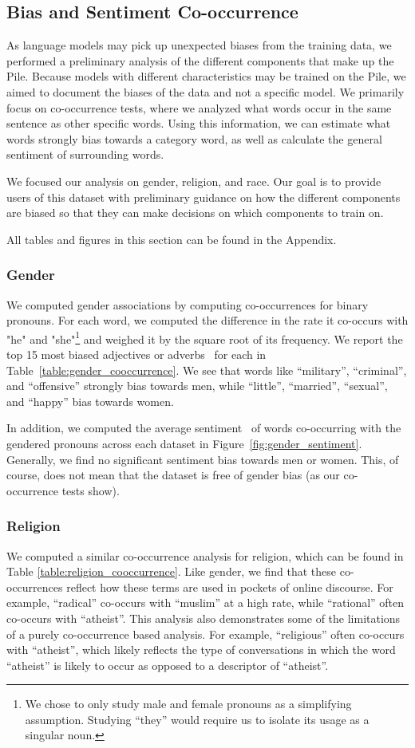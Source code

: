 \subsection{Bias and Sentiment Co-occurrence} As language models may pick up unexpected biases from the training data, we performed a preliminary analysis of the different components that make up the Pile. Because models with different characteristics may be trained on the Pile, we aimed to document the biases of the data and not a specific model. We primarily focus on co-occurrence tests, where we analyzed what words occur in the same sentence as other specific words. Using this information, we can estimate what words strongly bias towards a category word, as well as calculate the general sentiment of surrounding words.

We focused our analysis on gender, religion, and race. Our goal is to provide users of this dataset with preliminary guidance on how the different components are biased so that they can make decisions on which components to train on. 

All tables and figures in this section can be found in the Appendix.

\subsubsection{Gender}
We computed gender associations by computing co-occurrences for binary pronouns. For each word, we computed the difference in the rate it co-occurs with "he" and "she"\footnote{We chose to only study male and female pronouns as a simplifying assumption. Studying ``they'' would require us to isolate its usage as a singular noun. } and weighed it by the square root of its frequency. We report the top 15 most biased adjectives or adverbs~\citep{nltk} for each in Table~\ref{table:gender_cooccurrence}. We see that words like ``military'', ``criminal'', and ``offensive'' strongly bias towards men, while ``little'', ``married'', ``sexual'', and ``happy'' bias towards women.

In addition, we computed the average sentiment~\citep{sentiment} of words co-occurring with the gendered pronouns across each dataset in Figure~\ref{fig:gender_sentiment}. Generally, we find no significant sentiment bias towards men or women. This, of course, does not mean that the dataset is free of gender bias (as our co-occurrence tests show).

\subsubsection{Religion}
We computed a similar co-occurrence analysis for religion, which can be found in Table \ref{table:religion_cooccurrence}. Like gender, we find that these co-occurrences reflect how these terms are used in pockets of online discourse. For example, ``radical'' co-occurs with ``muslim'' at a high rate, while ``rational'' often co-occurs with ``atheist''. This analysis also demonstrates some of the limitations of a purely co-occurrence based analysis. For example, ``religious'' often co-occurs with ``atheist'', which likely reflects the type of conversations in which the word ``atheist'' is likely to occur as opposed to a descriptor of ``atheist''.

